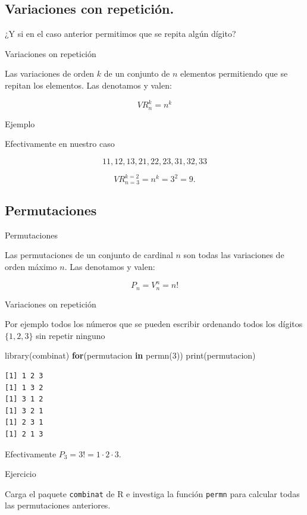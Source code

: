 \documentclass[
  letterpaper,
  DIV=11,
  numbers=noendperiod]{scrreprt}
\newenvironment{Shaded}{\begin{snugshade}}{\end{snugshade}}
\newcommand{\ControlFlowTok}[1]{\textcolor[rgb]{0.00,0.23,0.31}{\textbf{#1}}}
\newcommand{\DecValTok}[1]{\textcolor[rgb]{0.68,0.00,0.00}{#1}}
\newcommand{\FunctionTok}[1]{\textcolor[rgb]{0.28,0.35,0.67}{#1}}
\newcommand{\NormalTok}[1]{\textcolor[rgb]{0.00,0.23,0.31}{#1}}
\begin{document}
\subsection{Variaciones con
repetición.}\label{variaciones-con-repeticiuxf3n.}

¿Y si en el caso anterior permitimos que se repita algún dígito?

Variaciones on repetición

Las variaciones de orden \(k\) de un conjunto de \(n\) elementos
permitiendo que se repitan los elementos. Las denotamos y valen:

\[VR_n^k=n^k\]

Ejemplo

Efectivamente en nuestro caso

\[11,12,13,21,22,23,31,32,33\]

\[
VR^{k=2}_{n=3}=n^k=3^2=9.
\]

\subsection{Permutaciones}\label{permutaciones}

Permutaciones

Las permutaciones de un conjunto de cardinal \(n\) son todas las
variaciones de orden máximo \(n\). Las denotamos y valen:

\[
P_n=V_n^n=n!
\]

Variaciones on repetición

Por ejemplo todos los números que se pueden escribir ordenando todos los
dígitos \(\{1,2,3\}\) sin repetir ninguno

\begin{Shaded}
\begin{Highlighting}[]
\FunctionTok{library}\NormalTok{(combinat)}
\ControlFlowTok{for}\NormalTok{(permutacion }\ControlFlowTok{in} \FunctionTok{permn}\NormalTok{(}\DecValTok{3}\NormalTok{)) }\FunctionTok{print}\NormalTok{(permutacion)}
\end{Highlighting}
\end{Shaded}

\begin{verbatim}
[1] 1 2 3
[1] 1 3 2
[1] 3 1 2
[1] 3 2 1
[1] 2 3 1
[1] 2 1 3
\end{verbatim}

Efectivamente \(P_3=3!=1\cdot  2\cdot 3.\)

Ejercicio

Carga el paquete \texttt{combinat} de R e investiga la función
\texttt{permn} para calcular todas las permutaciones anteriores.
\end{document}
